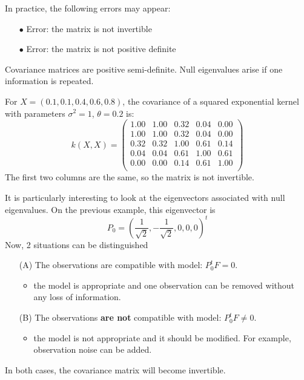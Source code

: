 \documentclass{beamer}
\begin{document}
\begin{frame}{}
In practice, the following errors may appear:\\
\begin{itemize}
	\item[\alert{$\bullet$}] \alert{Error: the matrix is not invertible}
	\item[\alert{$\bullet$}] \alert{Error: the matrix is not positive definite}
\end{itemize}
Covariance matrices are positive semi-definite. Null eigenvalues arise if one information is repeated.
\begin{example}
 For $X=(0.1,0.1,0.4,0.6,0.8)$, the covariance of a squared exponential kernel with parameters $\sigma^2=1$, $\theta = 0.2$ is: 
 \begin{equation*}
 k(X,X) = 
 \begin{pmatrix}
	1.00 & 1.00 & 0.32 & 0.04 & 0.00 \\
	1.00 & 1.00 & 0.32 & 0.04 & 0.00 \\
	0.32 & 0.32 & 1.00 & 0.61 & 0.14 \\
	0.04 & 0.04 & 0.61 & 1.00 & 0.61 \\
	0.00 & 0.00 & 0.14 & 0.61 & 1.00 \\
 \end{pmatrix}
 \end{equation*}
 The first two columns are the same, so the matrix is not invertible.
\end{example}
\end{frame}

\begin{frame}{}
It is particularly interesting to look at the eigenvectors associated with null eigenvalues. On the previous example, this eigenvector is 
\begin{equation*}
P_0 = \left( \frac{1}{\sqrt{2}},-\frac{1}{\sqrt{2}},0,0,0 \right)^t
\end{equation*}
Now, 2 situations can be distinguished\\ \vspace{2mm}
\begin{itemize}
	\item[(A)] The observations are compatible with model: $P_0^t F = 0$.
	\begin{itemize}
		\item the model is appropriate and one observation can be removed without any loss of information.
	\end{itemize}
	\item[(B)] The observations \textbf{are not} compatible with model: $P_0^t F \neq 0$.
		\begin{itemize}
			\item the model is not appropriate and it should be modified. For example, observation noise can be added.
		\end{itemize}
\end{itemize}
In both cases, the covariance matrix will become invertible.
\end{frame}
\end{document}

